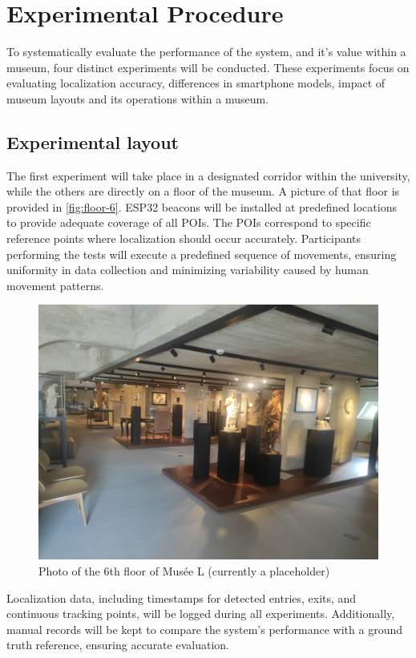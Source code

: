 \section{Experimental Procedure}

To systematically evaluate the performance of the system, and it's value within a museum, four distinct experiments will be conducted. These experiments focus on evaluating localization accuracy, differences in smartphone models, impact of museum layouts and its operations within a museum.

\subsection{Experimental layout}

The first experiment will take place in a designated corridor within the university, while the others are directly on a floor of the museum. A picture of that floor is provided in \autoref{fig:floor-6}. ESP32 beacons will  be installed at predefined locations to provide adequate coverage of all POIs. The POIs correspond to specific reference points where localization should occur accurately. Participants performing the tests will execute a predefined sequence of movements, ensuring uniformity in data collection and minimizing variability caused by human movement patterns.

\begin{figure}
    \centering
    \includegraphics[width=0.75\linewidth]{assets/image-floor.jpg}
		\caption{Photo of the 6th floor of Musée L (currently a placeholder)}
    \label{fig:floor-6}
\end{figure}

Localization data, including timestamps for detected entries, exits, and continuous tracking points, will be logged during all experiments. Additionally, manual records will be kept to compare the system's performance with a ground truth reference, ensuring accurate evaluation.

